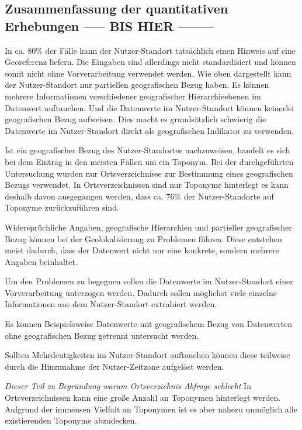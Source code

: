 		\subsection{Zusammenfassung der quantitativen Erhebungen ----- BIS HIER --------} 

			In ca. 80\% der Fälle kann der Nutzer-Standort tatsächlich einen Hinweis auf eine Georeferenz liefern.
			Die Eingaben sind allerdings nicht standardisiert und können somit nicht ohne Vorverarbeitung verwendet werden.
			Wie oben dargestellt kann der Nutzer-Standort nur partiellen geografischen Bezug haben.
			Es können mehrere Informationen verschiedener geografischer Hierarchieebenen im Datenwert auftauchen. 
			Und die Datenwerte im Nutzer-Standort können keinerlei geografischen Bezug aufweisen.
			Dies macht es grundsätzlich schwierig die Datenwerte im Nutzer-Standort direkt als geografischen Indikator zu verwenden.
			
			Ist ein geografischer Bezug des Nutzer-Standortes nachzuweisen, handelt es sich bei dem Eintrag in den meisten Fällen um ein Toponym.
			Bei der durchgeführten Untersuchung wurden nur Ortsverzeichnisse zur Bestimmung eines geografischen Bezugs verwendet.
			In Ortsverzeichnissen sind nur Toponyme hinterlegt es kann deshalb davon ausgegangen werden, dass ca. 76\% der Nutzer-Standorte auf Toponyme zurückzuführen sind.

			Widersprüchliche Angaben, geografische Hierarchien und partieller geografischer Bezug können bei der Geolokalisierung zu Problemen führen.
			Diese entstehen meist dadurch, dass der Datenwert nicht nur eine konkrete, sondern mehrere Angaben beinhaltet.
			
			Um den Problemen zu begegnen sollen die Datenwerte im Nutzer-Standort einer Vorverarbeitung unterzogen werden. 
			Dadurch sollen möglichst viele einzelne Informationen aus dem Nutzer-Standort extrahiert werden.

			Es können Beispielsweise Datenwerte mit geografischem Bezug von Datenwerten ohne geografischen Bezug getrennt untersucht werden.

			Sollten Mehrdeutigkeiten im Nutzer-Standort auftauchen können diese teilweise durch die Hinzunahme der Nutzer-Zeitzone aufgelöst werden.

			\textit{Dieser Teil zu Begründung warum Ortsverzichnis Abfrage schlecht} 
			In Ortsverzeichnissen kann eine große Anzahl an Toponymen hinterlegt werden.
			Aufgrund der immensen Vielfalt an Toponymen ist es aber nahezu unmöglich alle existierenden Toponyme abzudecken. 

